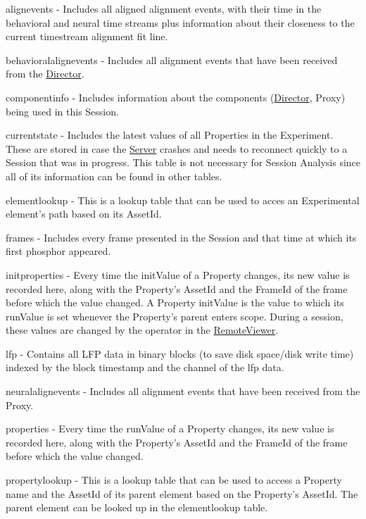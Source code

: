 \begin{DoxyItemize}
\item alignevents -\/ Includes all aligned alignment events, with their time in the behavioral and neural time streams plus information about their closeness to the current timestream alignment fit line.
\item behavioralalignevents -\/ Includes all alignment events that have been received from the \hyperlink{class_director}{Director}.
\item componentinfo -\/ Includes information about the components (\hyperlink{class_director}{Director}, Proxy) being used in this Session.
\item currentstate -\/ Includes the latest values of all Properties in the Experiment. These are stored in case the \hyperlink{class_server}{Server} crashes and needs to reconnect quickly to a Session that was in progress. This table is not necessary for Session Analysis since all of its information can be found in other tables.
\item elementlookup -\/ This is a lookup table that can be used to acces an Experimental element's path based on its Asset\-Id.
\item frames -\/ Includes every frame presented in the Session and that time at which its first phosphor appeared.
\item initproperties -\/ Every time the init\-Value of a Property changes, its new value is recorded here, along with the Property's Asset\-Id and the Frame\-Id of the frame before which the value changed. A Property init\-Value is the value to which its run\-Value is set whenever the Property's parent enters scope. During a session, these values are changed by the operator in the \hyperlink{class_remote_viewer}{Remote\-Viewer}.
\item lfp -\/ Contains all L\-F\-P data in binary blocks (to save disk space/disk write time) indexed by the block timestamp and the channel of the lfp data.
\item neuralalignevents -\/ Includes all alignment events that have been received from the Proxy.
\item properties -\/ Every time the run\-Value of a Property changes, its new value is recorded here, along with the Property's Asset\-Id and the Frame\-Id of the frame before which the value changed.
\item propertylookup -\/ This is a lookup table that can be used to access a Property name and the Asset\-Id of its parent element based on the Property's Asset\-Id. The parent element can be looked up in the elementlookup table.

\end{DoxyItemize}
